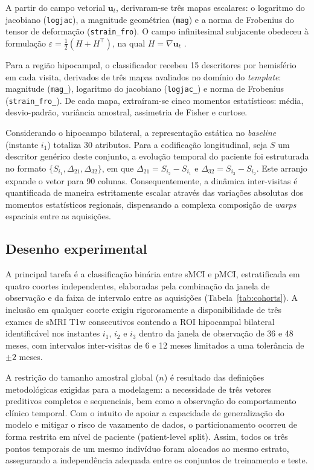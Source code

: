 \documentclass[review]{elsarticle}
\newcommand{\code}[1]{\texttt{#1}}
\begin{document}
A partir do campo vetorial $\mathbf{u}_t$, derivaram-se três mapas escalares: o logaritmo do jacobiano (\code{logjac}), a magnitude geométrica (\code{mag}) e a norma de Frobenius do tensor de deformação (\code{strain\_fro}). O campo infinitesimal subjacente obedeceu à formulação $\varepsilon = \frac{1}{2}(H+H^{\top})$, na qual $H = \nabla\mathbf{u}_t$ \citep{bouke-2023}.

Para a região hipocampal, o classificador recebeu 15 descritores por hemisfério em cada visita, derivados de três mapas avaliados no domínio do \emph{template}: magnitude (\code{mag\_}), logaritmo do jacobiano (\code{logjac\_}) e norma de Frobenius (\code{strain\_fro\_}). De cada mapa, extraíram-se cinco momentos estatísticos: média, desvio-padrão, variância amostral, assimetria de Fisher e curtose.

Considerando o hipocampo bilateral, a representação estática no \emph{baseline} (instante $i_1$) totaliza 30 atributos. Para a codificação longitudinal, seja $S$ um descritor genérico deste conjunto, a evolução temporal do paciente foi estruturada no formato $\{S_{i_1}, \Delta_{21}, \Delta_{32}\}$, em que $\Delta_{21} = S_{i_2} - S_{i_1}$ e $\Delta_{32} = S_{i_3} - S_{i_2}$. Este arranjo expande o vetor para 90 colunas. Consequentemente, a dinâmica inter-visitas é quantificada de maneira estritamente escalar através das variações absolutas dos momentos estatísticos regionais, dispensando a complexa composição de \emph{warps} espaciais entre as aquisições.

\subsection{Desenho experimental}\label{sec:experiments}

A principal tarefa é a classificação binária entre sMCI e pMCI, estratificada em quatro coortes independentes, elaboradas pela combinação da janela de observação e da faixa de intervalo entre as aquisições (Tabela~\ref{tab:cohorts}). A inclusão em qualquer coorte exigiu rigorosamente a disponibilidade de três exames de sMRI T1w consecutivos contendo a ROI hipocampal bilateral identificável nos instantes $i_1$, $i_2$ e $i_3$ dentro da janela de observação de 36 e 48 meses, com intervalos inter-visitas de 6 e 12 meses limitados a uma tolerância de $\pm 2$ meses.

A restrição do tamanho amostral global ($n$) é resultado das definições metodológicas exigidas para a modelagem: a necessidade de três vetores preditivos completos e sequenciais, bem como a observação do comportamento clínico temporal. Com o intuito de apoiar a capacidade de generalização do modelo e mitigar o risco de vazamento de dados, o particionamento ocorreu de forma restrita em nível de paciente (patient-level split). Assim, todos os três pontos temporais de um mesmo indivíduo foram alocados ao mesmo estrato, assegurando a independência adequada entre os conjuntos de treinamento e teste.
\end{document}
